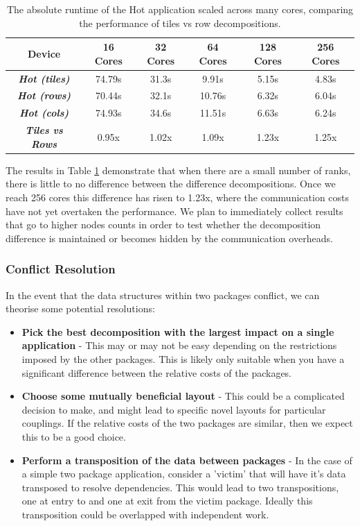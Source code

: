 \documentclass[runningheads,a4paper]{llncs}
\begin{document}
\begin{table}[h]
  \begin{center}
    \begin{tabular}{c|c|c|c|c|c}
      \hline
      \textbf{Device} & \textbf{16 Cores} & \textbf{32 Cores} & \textbf{64 Cores} & \textbf{128 Cores} & \textbf{256 Cores} \\
      \hline
      \textit{\textbf{Hot (tiles)}} & 74.79s & 31.3s &  9.91s  & 5.15s & 4.83s \\
      \textit{\textbf{Hot (rows)}}  & 70.44s & 32.1s &  10.76s & 6.32s & 6.04s \\ 
      \textit{\textbf{Hot (cols)}}  & 74.93s & 34.6s &  11.51s & 6.63s & 6.24s \\
      \textit{\textbf{Tiles vs Rows}}  & 0.95x & 1.02x & 1.09x & 1.23x & 1.25x \\
    \end{tabular}
  \end{center}
  \caption{The absolute runtime of the Hot application scaled across many cores, comparing the performance of tiles vs row decompositions.}
  \label{tab:hot-tiles-vs-rows}
\end{table}

The results in Table \ref{tab:hot-tiles-vs-rows} demonstrate that when there are a small number of ranks, there is little to no difference between the difference decompositions. Once we reach 256 cores this difference has risen to 1.23x, where the communication costs have not yet overtaken the performance. We plan to immediately collect results that go to higher nodes counts in order to test whether the decomposition difference is maintained or becomes hidden by the communication overheads.

\subsubsection{Conflict Resolution}

In the event that the data structures within two packages conflict, we can theorise some potential resolutions:

\begin{itemize}
  \item \textbf{Pick the best decomposition with the largest impact on a single application} - This may or may not be easy depending on the restrictions imposed by the other packages. This is likely only suitable when you have a significant difference between the relative costs of the packages.
  \item \textbf{Choose some mutually beneficial layout} - This could be a complicated decision to make, and might lead to specific novel layouts for particular couplings. If the relative costs of the two packages are similar, then we expect this to be a good choice.
  \item \textbf{Perform a transposition of the data between packages} - In the case of a simple two package application, consider a 'victim' that will have it's data transposed to resolve dependencies. This would lead to two transpositions, one at entry to and one at exit from the victim package. Ideally this transposition could be overlapped with independent work.
\end{itemize}
\end{document}
